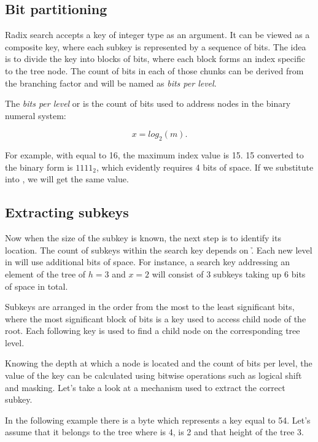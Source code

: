 \subsection*{Bit partitioning}
Radix search accepts a key of integer type as an argument. It can be viewed as a composite key, where each subkey is represented by a sequence of bits. The idea is to divide the key into blocks of bits, where each block forms an index specific to the tree node. The count of bits in each of those chunks can be derived from the branching factor and will be named as \emph{bits per level}.

The \emph{bits per level} or \x{} is the count of bits used to address \m{} nodes in the binary numeral system:

\begin{equation}
    \label{eq:bits-per-level}
    x = log_2(m).
\end{equation}

For example, with \m{} equal to 16, the maximum index value is 15. 15 converted to the binary form is $1111_2$, which evidently requires 4 bits of space. If we substitute \m{} into , we will get the same value. 

\subsection*{Extracting subkeys}

Now when the size of the subkey is known, the next step is to identify its location. The count of subkeys within the search key depends on \h. Each new level in \rbtree{} will use \x{} additional bits of space. For instance, a search key addressing an element of the tree of ${h = 3}$ and ${x = 2}$ will consist of 3 subkeys taking up 6 bits of space in total.

Subkeys are arranged in the order from the most to the least significant bits, where the most significant block of bits is a key used to access child node of the root. Each following key is used to find a child node on the corresponding tree level.

Knowing the depth at which a node is located and the count of bits per level, the value of the key can be calculated using bitwise operations such as logical shift and masking. Let's take a look at a mechanism used to extract the correct subkey. 

In the following example there is a byte which represents a key equal to 54. Let's assume that it belongs to the tree where \m{} is 4, \x{} is 2 and that height of the tree 3. 

